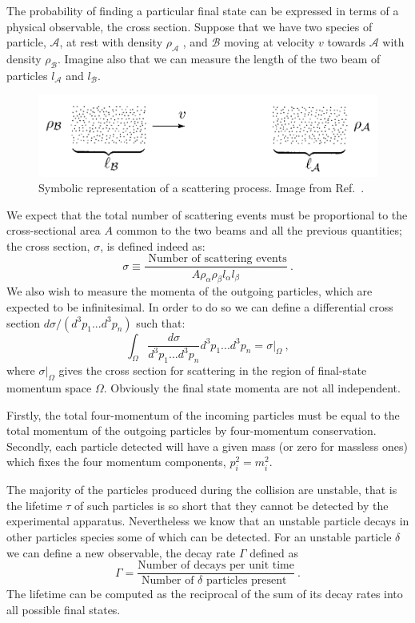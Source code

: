\documentclass[../main/main.tex]{subfiles}
\begin{document}
The probability of finding a particular final state can be expressed in terms of a physical observable, the cross section.
Suppose that we have two species of particle, $\mathcal{A}$, at rest with density $\rho_\mathcal{A}$ , and $\mathcal{B}$ moving at velocity $v$ towards $\mathcal{A}$ with density $\rho_\mathcal{B}$. Imagine also that we can measure the length of the two beam of particles $l_\mathcal{A}$ and $l_\mathcal{B}$. 

\begin{figure}[h]
	\centering
	\includegraphics[width=12cm]{../images/peskin.png}
	\caption{Symbolic representation of a scattering process. Image from Ref.~\cite{Peskin:1995ev}.}
	\label{Potential}
\end{figure}

We expect that the total number of scattering events must be proportional to the cross-sectional area $A$ common to the two beams and all the previous quantities; the cross section, $\sigma$, is defined indeed as:
\begin{equation}
	\sigma \equiv \frac{\text{ Number of scattering events}}{A \rho_\alpha \rho_\beta  l_\alpha l_\beta} \ .
\end{equation}
We also wish to measure the momenta of the outgoing particles, which are expected to be infinitesimal. In order to do so we can define a differential cross section $ d \sigma/(d^3p_1...d^3p_n)$ such that:
\begin{equation}
	\int_\Omega \frac{ d \sigma}{d^3p_1...d^3p_n}d^3p_1...d^3p_n = \sigma|_\Omega \ ,
\end{equation}
where $\sigma|_\Omega$ gives the cross section for scattering in the region of final-state momentum space $\Omega$. Obviously the final state momenta are not all independent.

Firstly, the total four-momentum of the incoming particles must be equal to the total momentum of the outgoing particles by four-momentum conservation. Secondly, each particle detected will have a given mass (or zero for massless ones) which fixes the four momentum components, $p_i^2 = m_i^2$.

The majority of the particles produced during the collision are unstable, that is the lifetime $\tau$ of 
such particles is so short that they cannot be detected by the experimental apparatus.
Nevertheless we know that an unstable particle decays in other particles species some of which can be detected. 
For an unstable particle $\delta$  we can define a new observable, the decay rate $\Gamma$ defined as 
\begin{equation}
	\Gamma = \frac{\text{Number of decays per unit time}}{\text{Number of  $\delta$  particles present }} \ .
\end{equation}
The lifetime can be computed as the reciprocal of the sum of its decay rates into all possible final states.
\end{document}
